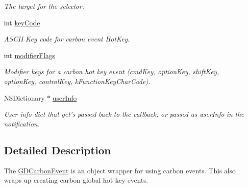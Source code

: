 \begin{DoxyCompactItemize}
\begin{DoxyCompactList}\small\item\em The target for the selector. \item\end{DoxyCompactList}\item 
\hypertarget{interface_g_d_carbon_event_abb0d08625c02fc6321a72519deb924cb}{
int \hyperlink{interface_g_d_carbon_event_abb0d08625c02fc6321a72519deb924cb}{keyCode}}
\label{interface_g_d_carbon_event_abb0d08625c02fc6321a72519deb924cb}

\begin{DoxyCompactList}\small\item\em ASCII Key code for carbon event HotKey. \item\end{DoxyCompactList}\item 
\hypertarget{interface_g_d_carbon_event_a8556b9bb2d4bcfdcb3c684321c0abd45}{
int \hyperlink{interface_g_d_carbon_event_a8556b9bb2d4bcfdcb3c684321c0abd45}{modifierFlags}}
\label{interface_g_d_carbon_event_a8556b9bb2d4bcfdcb3c684321c0abd45}

\begin{DoxyCompactList}\small\item\em Modifier keys for a carbon hot key event (cmdKey, optionKey, shiftKey, optionKey, controlKey, kFunctionKeyCharCode). \item\end{DoxyCompactList}\item 
\hypertarget{interface_g_d_carbon_event_a545cce7eee552212ce52a920bb3b0de1}{
NSDictionary $\ast$ \hyperlink{interface_g_d_carbon_event_a545cce7eee552212ce52a920bb3b0de1}{userInfo}}
\label{interface_g_d_carbon_event_a545cce7eee552212ce52a920bb3b0de1}

\begin{DoxyCompactList}\small\item\em User info dict that get's passed back to the callback, or passed as userInfo in the notification. \item\end{DoxyCompactList}\end{DoxyCompactItemize}


\subsection{Detailed Description}
The \hyperlink{interface_g_d_carbon_event}{GDCarbonEvent} is an object wrapper for using carbon events. This also wraps up creating carbon global hot key events.

